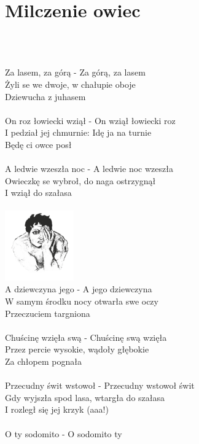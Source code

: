 \documentclass[a5paper, 10pt]{book}
\begin{document}
\section{Milczenie owiec}\textcolor{lightgray}{\textit{}}\\~\\
\begin{minipage}[t]{0.8\textwidth}
  Za lasem, za górą - Za górą, za lasem\\
  Żyli se we dwoje, w chałupie oboje\\
  Dziewucha z juhasem\\
  \\
  On roz łowiecki wziął - On wziął łowiecki roz\\
  I pedział jej chmurnie: Idę ja na turnie\\
  Będę ci owce posł\\
  \\
  A ledwie wzeszła noc - A ledwie noc wzeszła\\
  Owieczkę se wybroł, do naga ostrzygnął\\
  I wziął do szałasa\\
  \\
  \includegraphics[height=3cm, right]{images/milczenie_owiec.png}\vspace*{-3.05cm}\\
  A dziewczyna jego - A jego dziewczyna\\
  W samym środku nocy otwarła swe oczy\\
  Przeczuciem targniona\\
  \\
  Chuścinę wzięła swą - Chuścinę swą wzięła\\
  Przez percie wysokie, wądoły głębokie\\
  Za chłopem pognała\\
  \\
  Przecudny świt wstowoł - Przecudny wstowoł świt\\
  Gdy wyjszła spod lasa, wtargła do szałasa\\
  I rozległ się jej krzyk (aaa!)\\
  \\
  O ty sodomito - O sodomito ty\\

\end{minipage}
\end{document}
